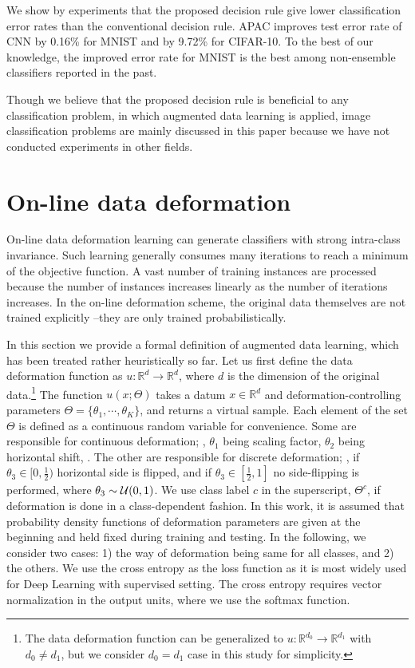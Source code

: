 \documentclass[10pt,twocolumn,letterpaper]{article}
\begin{document}
We show by experiments that the proposed decision rule give lower classification error rates than 
the conventional decision rule.
APAC improves test error rate of CNN by 0.16\% for MNIST and by 9.72\% for CIFAR-10.
To the best of our knowledge, the improved error rate for MNIST is the best among non-ensemble classifiers reported
in the past.

Though we believe that the proposed decision rule is beneficial to any classification problem,
in which augmented data learning is applied, 
image classification problems are mainly discussed in this paper
because we have not conducted experiments in other fields.

\section{On-line data deformation}

On-line data deformation learning can generate classifiers with strong intra-class invariance.
Such learning generally consumes many iterations to reach a minimum of the objective function.
A vast number of training instances are processed because 
the number of instances increases linearly as the number of iterations increases.
In the on-line deformation scheme, 
the original data themselves are not trained explicitly --they are only trained probabilistically.


In this section we provide a formal definition of augmented data learning, 
which has been treated rather heuristically so far.
Let us first define the data deformation function as
$u: \mathbb{R}^{d} \rightarrow \mathbb{R}^{d}$, where $d$ is the dimension of the 
original data.\footnote{The data deformation function can be generalized to 
$u: \mathbb{R}^{d_0} \rightarrow \mathbb{R}^{d_1}$ with $d_0 \neq d_1$, 
but we consider $d_0 = d_1$ case in this study for simplicity.}
The function $u(x; \Theta)$ 
takes a datum $x \in \mathbb{R}^{d}$ and deformation-controlling parameters $\Theta = \{\theta_1, \cdots, \theta_K\}$,
and returns a virtual sample.
Each element of the set $\Theta$ is defined as a continuous random variable for convenience.
Some are responsible for continuous deformation; 
\eg, $\theta_1$ being scaling factor, $\theta_2$ being horizontal shift, \etc.
The other are responsible for discrete deformation;
\eg, if $\theta_3 \in [0, \frac{1}{2})$ horizontal side is flipped, 
and if $\theta_3 \in [\frac{1}{2}, 1]$ no side-flipping is performed, 
where $\theta_3 \sim {\cal U}(0,1)$.
We use class label $c$ in the superscript, $\Theta^c$, if deformation is done in a class-dependent fashion.
In this work, it is assumed that probability density functions of 
deformation parameters are given at the beginning and
held fixed during training and testing.
In the following, we consider two cases: 
1) the way of deformation being same for all classes, and 
2) the others.
We use the cross entropy as the loss function as it is most widely used for Deep Learning with supervised setting.
The cross entropy requires vector normalization in the output units, where we use the softmax function.
\end{document}
